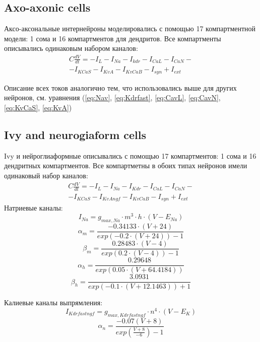 \documentclass[12pt]{article}
\begin{document}
\subsection{Axo-axonic cells}
Аксо-аксональные интернейроны моделировались с помощью 17 компартментной модели: 1 сома и 16 компартментов для дендритов. Все компартменты описывались одинаковым набором каналов:
\begin{eqnarray}
C\frac{dV}{dt}=-I_L-I_{Na}-I_{kdr}-I_{CaL}-I_{CaN}- \nonumber \\ 
-I_{KCaS}-I_{KvA}-I_{KvCaB}-I_{syn} + I_{ext}
\end{eqnarray}

Описание всех токов аналогично тем, что использовались выше для других нейронов, см. уравнения (\ref{eq:Nav}, \ref{eq:Kdrfast}, \ref{eq:CavL}, \ref{eq:CavN}, \ref{eq:KvCaS}, \ref{eq:KvA})

\subsection{Ivy and neurogiaform cells}
Ivy и нейроглиаформные описывались с помощью 17 компартментов: 1 сома и 16 дендритных компартментов. Все компартметны в обоих типах нейронов имели одинаковый набор каналов:
\begin{eqnarray}
C\frac{dV}{dt}=-I_L-I_{Na}-I_{Kdr} - I_{CaL}-I_{CaN}- \nonumber \\
-I_{KCaS} -I_{KvAngf}-I_{KvCaB}-I_{syn} + I_{ext}
\end{eqnarray}
Натриевые каналы:
\begin{equation}
\label{eq:Navngf}
I_{Na} = g_{max, Na} \cdot m^3 \cdot h \cdot (V - E_{Na})
\end{equation}
\begin{equation}
\alpha_m = \frac{-0.34133 \cdot (V + 24)}{exp(-0.2\cdot(V+24)) - 1}
\end{equation}
\begin{equation}
\beta_m = \frac{0.28483 \cdot (V -4)}{exp(0.2\cdot(V-4)) - 1}
\end{equation}
\begin{equation}
\alpha_h = \frac{0.29648}{exp(0.05\cdot(V+64.4184))}
\end{equation}
\begin{equation}
\beta_h = \frac{3.0931}{exp(-0.1\cdot(V+12.1463)) + 1}
\end{equation}

Калиевые каналы выпрямления:
\begin{equation}
\label{eq:Kdrfastngf}
I_{Kdrfastngf} = g_{max, Kdrfastngf} \cdot n^4 \cdot (V - E_K)
\end{equation}
\begin{equation}
\alpha_n = \frac{-0.07(V + 8)}{exp(\frac{V + 8}{-6}) - 1}
\end{equation}
\end{document}
